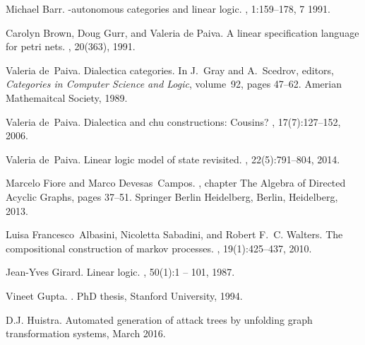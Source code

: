 \documentclass{sigplanconf}
\begin{document}
\begin{thebibliography}{10}
  \softraggedright
  
  Michael Barr.
  \newblock *-autonomous categories and linear logic.
  , 1:159--178, 7
  1991.

  Carolyn Brown, Doug Gurr, and Valeria de Paiva.
  \newblock A linear specification language for petri nets.
  , 20(363), 1991.

  Valeria de~Paiva.
  \newblock Dialectica categories.
  \newblock In J.~Gray and A.~Scedrov, editors, {\em Categories in Computer
    Science and Logic}, volume~92, pages 47--62. Amerian Mathemaitcal Society,
  1989.

  Valeria de~Paiva.
  \newblock Dialectica and chu constructions: Cousins?
  , 17(7):127--152, 2006.

  Valeria de~Paiva.
  \newblock Linear logic model of state revisited.
  , 22(5):791--804, 2014.

  Marcelo Fiore and Marco Devesas~Campos.
  , chapter The Algebra of Directed Acyclic
  Graphs, pages 37--51.
  \newblock Springer Berlin Heidelberg, Berlin, Heidelberg, 2013.

  Luisa Francesco~Albasini, Nicoletta Sabadini, and Robert F.~C. Walters.
  \newblock The compositional construction of markov processes.
  , 19(1):425--437, 2010.

  Jean-Yves Girard.
  \newblock Linear logic.
  , 50(1):1 -- 101, 1987.

  Vineet Gupta.
  .
  \newblock PhD thesis, Stanford University, 1994.

  D.J. {Huistra}.
  \newblock Automated generation of attack trees by unfolding graph
  transformation systems, March 2016.


\end{thebibliography}
\end{document}
